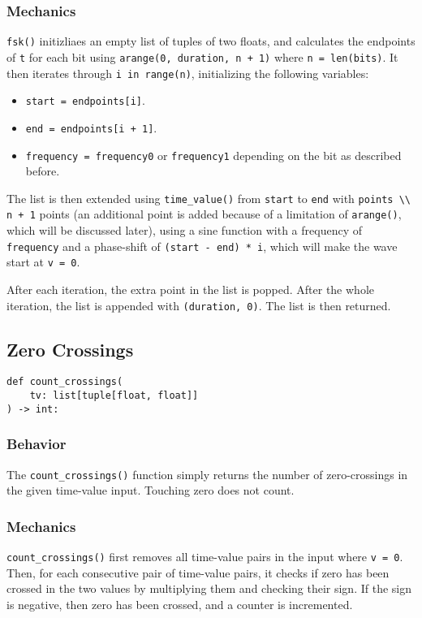 \documentclass{article}
\begin{document}
			\subsubsection{Mechanics}
				\verb|fsk()| initizliaes an empty list of tuples of two floats,
				and calculates the endpoints of \verb|t| for each bit using \verb|arange(0, duration, n + 1)|
				where \verb|n = len(bits)|. It then iterates through \verb|i in range(n)|, initializing the following
				variables:

				\begin{itemize}
					\item \verb|start = endpoints[i]|.
					\item \verb|end = endpoints[i + 1]|.
					\item \verb|frequency = frequency0| or \verb|frequency1| depending on the bit as described before.
				\end{itemize}

				The list is then extended using \verb|time_value()| from \verb|start| to \verb|end| with \verb|points \\ n + 1|
				points (an additional point is added because of a limitation of \verb|arange()|, which will be discussed later),
				using a sine function with a frequency of \verb|frequency| and a phase-shift of \verb|(start - end) * i|, which
				will make the wave start at \verb|v = 0|.

				After each iteration, the extra point in the list is popped. After the whole iteration, the list is appended
				with \verb|(duration, 0)|. The list is then returned.

			\pagebreak



		\subsection{Zero Crossings}
			\begin{verbatim}
def count_crossings(
	tv: list[tuple[float, float]]
) -> int:
			\end{verbatim}

			\subsubsection{Behavior}
				The \verb|count_crossings()| function simply returns the number of zero-crossings in the given time-value input.
				Touching zero does not count.

			\subsubsection{Mechanics}
				\verb|count_crossings()| first removes all time-value pairs in the input where \verb|v = 0|. Then, for each
				consecutive pair of time-value pairs, it checks if zero has been crossed in the two values by multiplying them
				and checking their sign. If the sign is negative, then zero has been crossed, and a counter is incremented.
\end{document}
